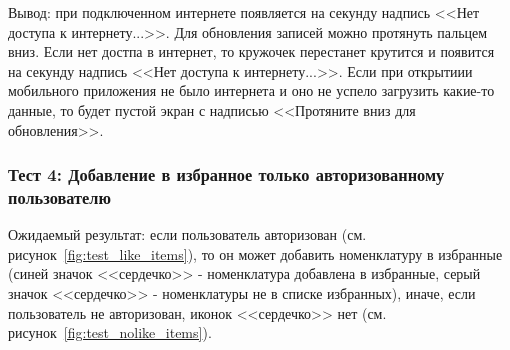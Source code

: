 
  

Вывод: при подключенном интернете появляется на секунду надпись <<Нет доступа к интернету...>>.
Для обновления записей можно протянуть пальцем вниз. Если нет достпа в интернет,
то кружочек перестанет крутится и появится на секунду надпись <<Нет доступа к интернету...>>.
Если при открытиии мобильного приложения не было интернета и оно не успело загрузить какие-то данные, то будет пустой экран с надписью
<<Протяните вниз для обновления>>.

\subsubsection*{Тест 4: Добавление в избранное только авторизованному пользователю}

Ожидаемый результат: если пользователь авторизован (см. рисунок~\ref{fig:test_like_items}), то он может добавить номенклатуру в избранные
(синей значок <<сердечко>> - номенклатура добавлена в избранные,
серый значок <<сердечко>> - номенклатуры не в списке избранных),
иначе, если пользователь не авторизован, иконок <<сердечко>> нет (см. рисунок~\ref{fig:test_nolike_items}).






